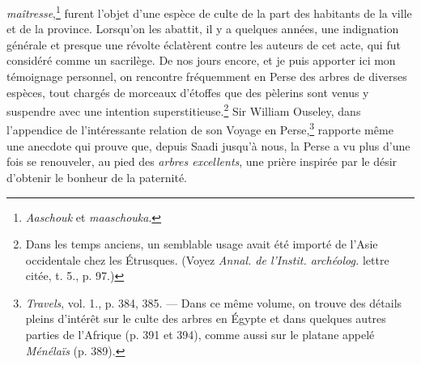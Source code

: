 \documentclass{article}
\begin{document}
\emph{maîtresse},\footnote{\emph{Aaschouk} et \emph{maaschouka}.} furent l'objet d'une espèce de culte de la part des habitants de la ville et de la province. Lorsqu'on les abattit, il y a quelques années, une indignation générale et presque une révolte éclatèrent contre les auteurs de cet acte, qui fut considéré comme un sacrilège. De nos jours encore, et je puis apporter ici mon témoignage personnel, on rencontre fréquemment en Perse des arbres de diverses espèces, tout chargés de morceaux d'étoffes que des pèlerins sont venus y suspendre avec une intention superstitieuse.\footnote{Dans les temps anciens, un semblable usage avait été importé de l'Asie occidentale chez les Étrusques. (Voyez \emph{Annal. de l'Instit. archéolog.} lettre citée, t. 5., p. 97.)} Sir William Ouseley, dans l'appendice de l'intéressante relation de son Voyage en Perse,\footnote{\emph{Travels}, vol. 1., p. 384, 385. --- Dans ce même volume, on trouve des détails pleins d'intérêt sur le culte des arbres en Égypte et dans quelques autres parties de l'Afrique (p. 391 et 394), comme aussi sur le platane appelé \emph{Ménélaïs} (p. 389).} rapporte même une anecdote qui prouve que, depuis Saadi jusqu'à nous, la Perse a vu plus d'une fois se renouveler, au pied des \emph{arbres excellents}, une prière inspirée par le désir d'obtenir le bonheur de la paternité.
\end{document}
